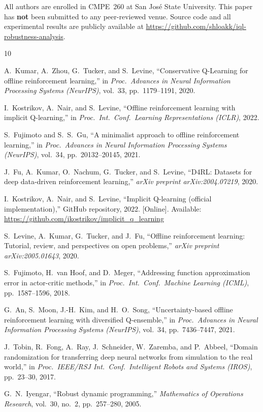 \documentclass[conference]{IEEEtran}
\begin{document}
All authors are enrolled in CMPE~260 at San Jos\'{e} State University.
This paper has \textbf{not} been submitted to any peer-reviewed venue.
Source code and all experimental results are publicly available at
\url{https://github.com/shloakk/iql-robustness-analysis}.

\begin{thebibliography}{10}

A.~Kumar, A.~Zhou, G.~Tucker, and S.~Levine,
``Conservative Q-Learning for offline reinforcement learning,''
in \textit{Proc.\ Advances in Neural Information Processing Systems
(NeurIPS)}, vol.~33, pp.~1179--1191, 2020.

I.~Kostrikov, A.~Nair, and S.~Levine,
``Offline reinforcement learning with implicit Q-learning,''
in \textit{Proc.\ Int.\ Conf.\ Learning Representations (ICLR)}, 2022.

S.~Fujimoto and S.~S.~Gu,
``A minimalist approach to offline reinforcement learning,''
in \textit{Proc.\ Advances in Neural Information Processing Systems
(NeurIPS)}, vol.~34, pp.~20132--20145, 2021.

J.~Fu, A.~Kumar, O.~Nachum, G.~Tucker, and S.~Levine,
``D4RL: Datasets for deep data-driven reinforcement learning,''
\textit{arXiv preprint arXiv:2004.07219}, 2020.

I.~Kostrikov, A.~Nair, and S.~Levine,
``Implicit Q-learning (official implementation),''
GitHub repository, 2022. [Online].
Available: \url{https://github.com/ikostrikov/implicit_q_learning}

S.~Levine, A.~Kumar, G.~Tucker, and J.~Fu,
``Offline reinforcement learning: Tutorial, review, and perspectives on open
problems,''
\textit{arXiv preprint arXiv:2005.01643}, 2020.

S.~Fujimoto, H.~van Hoof, and D.~Meger,
``Addressing function approximation error in actor-critic methods,''
in \textit{Proc.\ Int.\ Conf.\ Machine Learning (ICML)},
pp.~1587--1596, 2018.

G.~An, S.~Moon, J.-H.~Kim, and H.~O.~Song,
``Uncertainty-based offline reinforcement learning with diversified
Q-ensemble,''
in \textit{Proc.\ Advances in Neural Information Processing Systems
(NeurIPS)}, vol.~34, pp.~7436--7447, 2021.

J.~Tobin, R.~Fong, A.~Ray, J.~Schneider, W.~Zaremba, and P.~Abbeel,
``Domain randomization for transferring deep neural networks from simulation
to the real world,''
in \textit{Proc.\ IEEE/RSJ Int.\ Conf.\ Intelligent Robots and Systems
(IROS)}, pp.~23--30, 2017.

G.~N.~Iyengar,
``Robust dynamic programming,''
\textit{Mathematics of Operations Research}, vol.~30, no.~2,
pp.~257--280, 2005.

\end{thebibliography}
\end{document}

